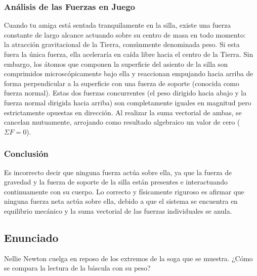 \documentclass[12pt,letterpaper]{article}
\begin{document}
\subsubsection*{Análisis de las Fuerzas en Juego}
Cuando tu amiga está sentada tranquilamente en la silla, existe una fuerza constante de largo alcance actuando sobre su centro de masa en todo momento: la atracción gravitacional de la Tierra, comúnmente denominada peso. Si esta fuera la única fuerza, ella aceleraría en caída libre hacia el centro de la Tierra. Sin embargo, los átomos que componen la superficie del asiento de la silla son comprimidos microscópicamente bajo ella y reaccionan empujando hacia arriba de forma perpendicular a la superficie con una fuerza de soporte (conocida como fuerza normal). 
Estas dos fuerzas concurrentes (el peso dirigido hacia abajo y la fuerza normal dirigida hacia arriba) son completamente iguales en magnitud pero estrictamente opuestas en dirección. Al realizar la suma vectorial de ambas, se cancelan mutuamente, arrojando como resultado algebraico un valor de cero ($\Sigma F = 0$).

\subsubsection*{Conclusión}
Es incorrecto decir que ninguna fuerza actúa sobre ella, ya que la fuerza de gravedad y la fuerza de soporte de la silla están presentes e interactuando continuamente con su cuerpo. Lo correcto y físicamente riguroso es afirmar que ninguna fuerza neta actúa sobre ella, debido a que el sistema se encuentra en equilibrio mecánico y la suma vectorial de las fuerzas individuales se anula.

\newpage

\subsection*{Enunciado}
Nellie Newton cuelga en reposo de los extremos de la soga que se muestra. ¿Cómo se compara la lectura de la báscula con su peso?
\end{document}
